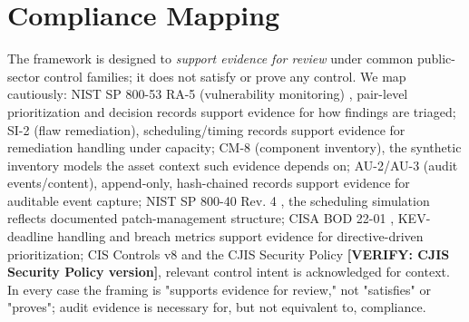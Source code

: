 \section{Compliance Mapping}

The framework is designed to \textit{support evidence for review} under common
public-sector control families; it does not satisfy or prove any control. We map
cautiously: NIST SP 800-53 RA-5 (vulnerability monitoring) \cite{nist80053r5}, 
pair-level prioritization and decision records support evidence for how findings
are triaged; SI-2 (flaw remediation), scheduling/timing records support evidence
for remediation handling under capacity; CM-8 (component inventory), the synthetic
inventory models the asset context such evidence depends on; AU-2/AU-3 (audit
events/content), append-only, hash-chained records support evidence for auditable
event capture; NIST SP 800-40 Rev. 4 \cite{nist80040r4}, the scheduling simulation
reflects documented patch-management structure; CISA BOD 22-01 \cite{cisa_bod2201}, 
KEV-deadline handling and breach metrics support evidence for directive-driven
prioritization; CIS Controls v8 \cite{cis_controls_v8} and the CJIS Security Policy
\textbf{[VERIFY: CJIS Security Policy version]}, relevant control intent is acknowledged for
context. In every case the framing is "supports evidence for review," not
"satisfies" or "proves"; audit evidence is necessary for, but not equivalent to,
compliance.
